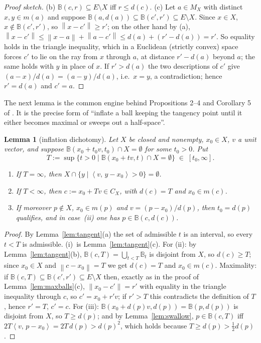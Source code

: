 \documentclass[11pt]{article}
\newtheorem{lemma}[theorem]{Lemma}
\theoremstyle{remark}
\newcommand{\B}{\mathbb{B}}
\newcommand{\X}{X}
\newcommand{\sca}[2]{\left\langle #1,\, #2\right\rangle}
\newcommand{\norm}[1]{\left\lVert #1\right\rVert}
\newcommand{\Mx}{M_{\X}}
\newcommand{\Cx}{C_{\X}}
\begin{document}
\begin{proof}[Proof sketch]
(b) $\B(c,r)\subseteq E\setminus\X$ iff $r\le d(c)$. (c) Let $a\in\Mx$ with distinct
$x,y\in m(a)$ and suppose $\B(a,d(a))\subseteq\B(c',r')\subseteq E\setminus\X$. Since
$x\in \X$, $x\notin\B(c',r')$, so $\norm{x-c'}\ge r'$; on the other hand by (a),
$\norm{x-c'}\le\norm{x-a}+\norm{a-c'}\le d(a)+(r'-d(a))=r'$. So equality holds in the triangle
inequality, which in a Euclidean (strictly convex) space forces $c'$ to lie on the ray from $x$
through $a$, at distance $r'-d(a)$ beyond $a$; the same holds with $y$ in place of $x$. If
$r'>d(a)$ the two descriptions of $c'$ give $(a-x)/d(a)=(a-y)/d(a)$, i.e.\ $x=y$, a
contradiction; hence $r'=d(a)$ and $c'=a$.
\end{proof}

The next lemma is the common engine behind Propositions 2--4 and Corollary 5 of \cite{Bia}.
It is the precise form of ``inflate a ball keeping the tangency point until it either becomes
maximal or sweeps out a half-space''.

\begin{lemma}[inflation dichotomy]\label{lem:dicho}
Let $\X$ be closed and nonempty, $x_0\in \X$, $v$ a unit vector, and suppose
$\B(x_0+t_0v,t_0)\cap \X=\emptyset$ for some $t_0>0$. Put
\[
 T:=\sup\{t>0\mid \B(x_0+tv,t)\cap \X=\emptyset\}\;\in\;[t_0,\infty].
\]
\begin{enumerate}[label=(\roman*),itemsep=1pt]
\item If $T=\infty$, then $\X\cap\{y\mid\sca{v}{y-x_0}>0\}=\emptyset$.
\item If $T<\infty$, then $c:=x_0+Tv\in\Cx$, with $d(c)=T$ and $x_0\in m(c)$.
\item If moreover $p\notin \X$, $x_0\in m(p)$ and $v=(p-x_0)/d(p)$, then $t_0=d(p)$ qualifies,
and in case~(ii) one has $p\in\B(c,d(c))$.
\end{enumerate}
\end{lemma}

\begin{proof}
By Lemma~\ref{lem:tangent}(a) the set of admissible $t$ is an interval, so every $t<T$ is
admissible. (i)~is Lemma~\ref{lem:tangent}(c). For (ii): by Lemma~\ref{lem:tangent}(b),
$\B(c,T)=\bigcup_{t<T}\B_t$ is disjoint from $\X$, so $d(c)\ge T$; since $x_0\in \X$ and
$\norm{c-x_0}=T$ we get $d(c)=T$ and $x_0\in m(c)$. Maximality: if
$\B(c,T)\subseteq\B(c',r')\subseteq E\setminus\X$ then, exactly as in the proof of
Lemma~\ref{lem:maxballs}(c), $\norm{x_0-c'}=r'$ with equality in the triangle inequality through
$c$, so $c'=x_0+r'v$; if $r'>T$ this contradicts the definition of $T$, hence $r'=T$, $c'=c$.
For (iii): $\B(x_0+d(p)v,d(p))=\B(p,d(p))$ is disjoint from $\X$, so $T\ge d(p)$; and by
Lemma~\ref{lem:swallow}, $p\in\B(c,T)$ iff $2T\sca{v}{p-x_0}=2T\,d(p)>d(p)^2$, which holds
because $T\ge d(p)>\tfrac12 d(p)$.
\end{proof}
\end{document}
